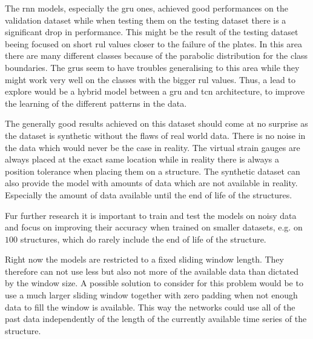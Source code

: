 \documentclass[conference]{IEEEtran}
\begin{document}
The \gls{rnn} models, especially the \gls{gru} ones, achieved good performances on the validation dataset while when testing them on the testing dataset there is a significant drop in performance. This might be the result of the testing dataset beeing focused on short \gls{rul} values closer to the failure of the plates. In this area there are many different classes because of the parabolic distribution for the class boundaries. The \glspl{gru} seem to have troubles generalising to this area while they might work very well on the classes with the bigger \gls{rul} values. Thus, a lead to explore would be a hybrid model between a \gls{gru} and \gls{tcn} architecture, to improve the learning of the different patterns in the data.

The generally good results achieved on this dataset should come at no surprise as the dataset is synthetic without the flaws of real world data. There is no noise in the data which would never be the case in reality. The virtual strain gauges are always placed at the exact same location while in reality there is always a position tolerance when placing them on a structure. The synthetic dataset can also provide the model with amounts of data which are not available in reality. Especially the amount of data available until the end of life of the structures.

Fur further research it is important to train and test the models on noisy data and focus on improving their accuracy when trained on smaller datasets, e.g. on $ 100 $ structures, which do rarely include the end of life of the structure.

Right now the models are restricted to a fixed sliding window length. They therefore can not use less but also not more of the available data than dictated by the window size. A possible solution to consider for this problem would be to use a much larger sliding window together with zero padding when not enough data to fill the window is available. This way the networks could use all of the past data independently of the length of the currently available time series of the structure.

\newpage
\printbibliography
\end{document}
